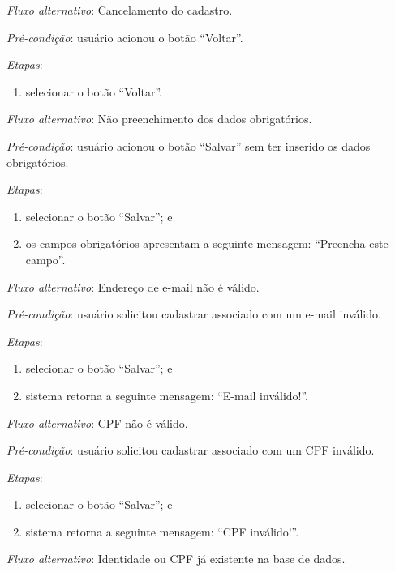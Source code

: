 \documentclass[a4paper,12pt]{article}
\begin{document}
\noindent \textit{Fluxo alternativo}: Cancelamento do cadastro.

\noindent \textit{Pré-condição}: usuário acionou o botão ``Voltar''.

\noindent \textit{Etapas}:

\begin{enumerate}
    \item selecionar o botão ``Voltar''.
\end{enumerate}

\noindent \textit{Fluxo alternativo}: Não preenchimento dos dados obrigatórios.

\noindent \textit{Pré-condição}: usuário acionou o botão ``Salvar'' sem ter inserido os dados obrigatórios.

\noindent \textit{Etapas}:

\begin{enumerate}
    \item selecionar o botão ``Salvar''; e
    \item os campos obrigatórios apresentam a seguinte mensagem: ``Preencha este campo''.
\end{enumerate}


\noindent \textit{Fluxo alternativo}: Endereço de e-mail não é válido.

\noindent \textit{Pré-condição}: usuário solicitou cadastrar associado com um e-mail inválido.

\noindent \textit{Etapas}:

\begin{enumerate}
    \item selecionar o botão ``Salvar''; e
    \item sistema retorna a seguinte mensagem: ``E-mail inválido!''.
\end{enumerate}


\noindent \textit{Fluxo alternativo}: CPF não é válido.

\noindent \textit{Pré-condição}: usuário solicitou cadastrar associado com um CPF inválido.

\noindent \textit{Etapas}:

\begin{enumerate}
    \item selecionar o botão ``Salvar''; e
    \item sistema retorna a seguinte mensagem: ``CPF inválido!''.
\end{enumerate}


\noindent \textit{Fluxo alternativo}: Identidade ou CPF já existente na base de dados.
\end{document}
